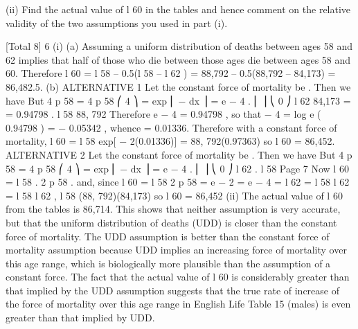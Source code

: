 \documentclass[a4paper,12pt]{article}
\begin{document}
(ii)
Find the actual value of l 60 in the tables and hence comment on the relative validity of the two assumptions you used in part (i).

[Total 8]
6
(i)
(a)
Assuming a uniform distribution of deaths between ages 58 and 62
implies that half of those who die between those ages die between ages 58 and 60.
Therefore
l 60
= l 58 – 0.5(l 58 – l 62 )
= 88,792 – 0.5(88,792 – 84,173)
= 86,482.5.
(b)
ALTERNATIVE 1
Let the constant force of mortality be \mu.
Then we have
But
4 p 58
=
4 p 58
⎛ 4
⎞
= exp ⎜ − \int \mu dx ⎟ = e − 4 \mu .
⎜
⎟
⎝ 0
⎠
l 62 84,173
=
= 0.94798 .
l 58 88, 792
Therefore e − 4 \mu = 0.94798 ,
so that − 4 \mu = log e ( 0.94798 ) = − 0.05342 ,
whence \mu = 0.01336.
Therefore with a constant force of mortality,
l 60 = l 58 exp[ − 2(0.01336)] = 88, 792(0.97363)
so l 60 = 86,452.
ALTERNATIVE 2
Let the constant force of mortality be \mu.
Then we have
But 4 p 58 =
4 p 58
⎛ 4
⎞
= exp ⎜ − \int \mu dx ⎟ = e − 4 \mu .
⎜
⎟
⎝ 0
⎠
l 62
.
l 58
Page 7%
Now l 60 = l 58 . 2 p 58 .
and, since
l 60 = l 58
2 p 58
= e − 2 \mu = e − 4 \mu =
l 62
= l 58 l 62 =
l 58
l 62
,
l 58
(88, 792)(84,173)
so l 60 = 86,452
(ii)
The actual value of l 60 from the tables is 86,714.
This shows that neither assumption is very accurate, but that the uniform distribution of deaths (UDD) is closer than the constant force of mortality. The UDD assumption is better than the constant force of mortality assumption because UDD implies an increasing force of mortality over this age range, which is biologically more plausible than the assumption of a constant force. The fact that the actual value of l 60 is considerably greater than that implied by the UDD assumption suggests that the true rate of increase of the force of mortality over this age range in English Life Table 15 (males) is even greater
than that implied by UDD.
\end{document}
